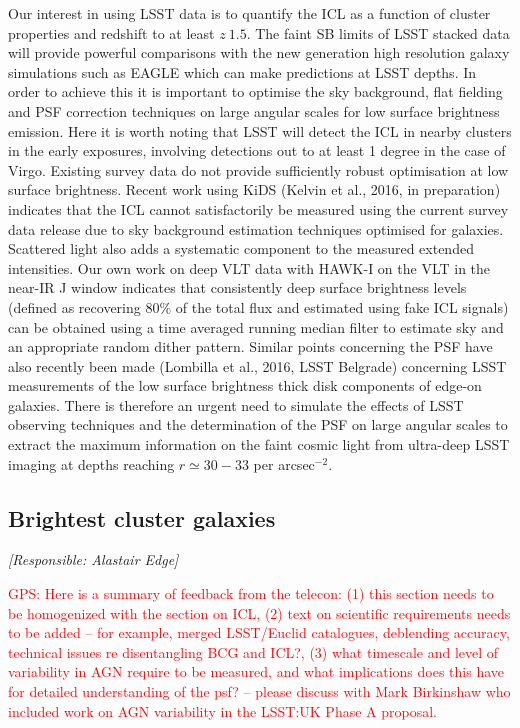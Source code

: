 \documentclass[a4paper,11pt]{article}
\newcommand{\red}{\textcolor{red}}
\begin{document}
Our interest in using LSST data is to quantify the ICL as a function
of cluster properties and redshift to at least $z~1.5$. The faint SB
limits of LSST stacked data will provide powerful comparisons with the
new generation high resolution galaxy simulations such as EAGLE which
can make predictions at LSST depths. In order to achieve this it is
important to optimise the sky background, flat fielding and PSF
correction techniques on large angular scales for low surface
brightness emission. Here it is worth noting that LSST will detect the
ICL in nearby clusters in the early exposures, involving detections
out to at least 1 degree in the case of Virgo. Existing survey data do
not provide sufficiently robust optimisation at low surface
brightness. Recent work using KiDS (Kelvin et al., 2016, in
preparation) indicates that the ICL cannot satisfactorily be measured
using the current survey data release due to sky background estimation
techniques optimised for galaxies. Scattered light also adds a
systematic component to the measured extended intensities. Our own
work on deep VLT data with HAWK-I on the VLT in the near-IR J window
indicates that consistently deep surface brightness levels (defined as
recovering $80\%$ of the total flux and estimated using fake ICL
signals) can be obtained using a time averaged running median filter
to estimate sky and an appropriate random dither pattern. Similar
points concerning the PSF have also recently been made (Lombilla et
al., 2016, LSST Belgrade) concerning LSST measurements of the low
surface brightness thick disk components of edge-on galaxies. There is
therefore an urgent need to simulate the effects of LSST observing
techniques and the determination of the PSF on large angular scales to
extract the maximum information on the faint cosmic light from
ultra-deep LSST imaging at depths reaching $r \simeq 30-33$ per
arcsec$^{-2}$.

\subsection{Brightest cluster galaxies}

{\it [Responsible: Alastair Edge]}

\noindent\red{GPS: Here is a summary of feedback from the telecon: (1)
  this section needs to be homogenized with the section on ICL, (2)
  text on scientific requirements needs to be added -- for example,
  merged LSST/Euclid catalogues, deblending accuracy, technical issues
  re disentangling BCG and ICL?, (3) what timescale and level of
  variability in AGN require to be measured, and what implications
  does this have for detailed understanding of the psf? -- please
  discuss with Mark Birkinshaw who included work on AGN variability in
  the LSST:UK Phase A proposal.}
\end{document}

